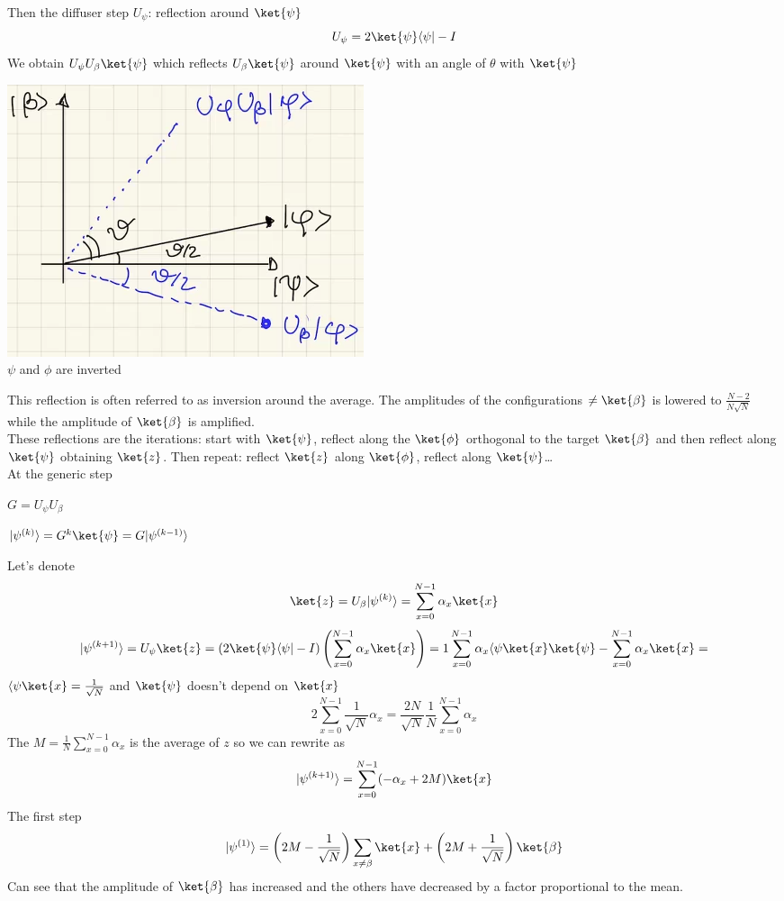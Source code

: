 \documentclass[10pt]{report}
\begin{document}
Then the diffuser step $U_\psi$: reflection around $\ket{\psi}$
$$U_\psi = 2\ket{\psi}\langle\psi|-I$$
We obtain $U_\psi U_\beta\ket{\psi}$ which reflects $U_\beta\ket{\psi}
$ around $\ket{\psi}$ with an angle of $\theta$ with $\ket{\psi}$
\begin{center}
	\includegraphics[scale=0.5]{35.png}\\
	$\psi$ and $\phi$ are inverted
\end{center}
This reflection is often referred to as inversion around the average. The amplitudes of the configurations $\neq\ket{\beta}$ is lowered to $\frac{N-2}{N\sqrt{N}}$ while the amplitude of $\ket{\beta}$ is amplified.\\
These reflections are the iterations: start with $\ket{\psi}$, reflect along the $\ket{\phi}$ orthogonal to the target $\ket{\beta}$ and then reflect along $\ket{\psi}$ obtaining $\ket{z}$. Then repeat: reflect $\ket{z}$ along $\ket{\phi}$, reflect along $\ket{\psi}$\ldots\\At the generic step\begin{list}{}{}
	\item $G=U_\psi U_\beta$
	\item $|\psi^{(k)}\rangle = G^k\ket{\psi} = G|\psi^{(k-1)}\rangle$
\end{list}
Let's denote
$$\ket{z} = U_\beta|\psi^{(k)}\rangle = \sum_{x=0}^{N-1}\alpha_x\ket{x}$$
$$|\psi^{(k+1)}\rangle=U_\psi\ket{z} = (2\ket{\psi}\langle\psi| - I)\left(\sum_{x=0}^{N-1}\alpha_x\ket{x}\right) = 1\sum_{x=0}^{N-1}\alpha_x\langle\psi\ket{x}\ket{\psi}-\sum_{x=0}^{N-1}\alpha_x\ket{x} = $$
$\langle\psi\ket{x} = \frac{1}{\sqrt{N}}$ and $\ket{\psi}$ doesn't depend on $\ket{x}$
$$2\sum_{x=0}^{N-1}\frac{1}{\sqrt{N}}\alpha_x = \frac{2N}{\sqrt{N}}\frac{1}{N}\sum_{x=0}^{N-1}\alpha_x$$
The $M = \frac{1}{N}\sum_{x=0}^{N-1}\alpha_x$ is the average of $z$ so we can rewrite as
$$|\psi^{(k+1)}\rangle=\sum_{x=0}^{N-1}(-\alpha_x + 2M)\ket{x}$$
The first step
$$|\psi^{(1)}\rangle = \left(2M-\frac{1}{\sqrt{N}}\right)\sum_{x\neq\beta}\ket{x}+\left(2M+\frac{1}{\sqrt{N}}\right)\ket{\beta}$$
Can see that the amplitude of $\ket{\beta}$ has increased and the others have decreased by a factor proportional to the mean.
\end{document}
